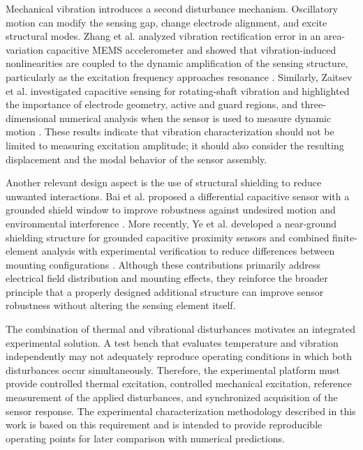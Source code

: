 \documentclass[conference]{IEEEtran}
\begin{document}
Mechanical vibration introduces a second disturbance mechanism. Oscillatory motion can modify the sensing gap, change electrode alignment, and excite structural modes. Zhang et al. analyzed vibration rectification error in an area-variation capacitive MEMS accelerometer and showed that vibration-induced nonlinearities are coupled to the dynamic amplification of the sensing structure, particularly as the excitation frequency approaches resonance \cite{Zhang2024}. Similarly, Zaitsev et al. investigated capacitive sensing for rotating-shaft vibration and highlighted the importance of electrode geometry, active and guard regions, and three-dimensional numerical analysis when the sensor is used to measure dynamic motion \cite{Zaitsev2022}. These results indicate that vibration characterization should not be limited to measuring excitation amplitude; it should also consider the resulting displacement and the modal behavior of the sensor assembly.

Another relevant design aspect is the use of structural shielding to reduce unwanted interactions. Bai et al. proposed a differential capacitive sensor with a grounded shield window to improve robustness against undesired motion and environmental interference \cite{Bai2016}. More recently, Ye et al. developed a near-ground shielding structure for grounded capacitive proximity sensors and combined finite-element analysis with experimental verification to reduce differences between mounting configurations \cite{Ye2025}. Although these contributions primarily address electrical field distribution and mounting effects, they reinforce the broader principle that a properly designed additional structure can improve sensor robustness without altering the sensing element itself.

The combination of thermal and vibrational disturbances motivates an integrated experimental solution. A test bench that evaluates temperature and vibration independently may not adequately reproduce operating conditions in which both disturbances occur simultaneously. Therefore, the experimental platform must provide controlled thermal excitation, controlled mechanical excitation, reference measurement of the applied disturbances, and synchronized acquisition of the sensor response. The experimental characterization methodology described in this work is based on this requirement and is intended to provide reproducible operating points for later comparison with numerical predictions.
\end{document}
